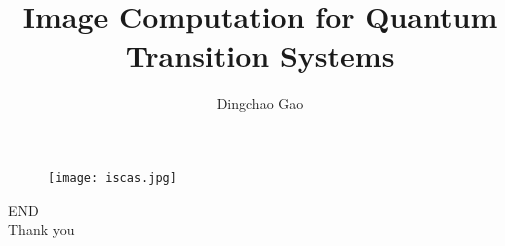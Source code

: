 \documentclass[aspectratio=1610]{beamer}
\title[TDD in quantum]{Image Computation for Quantum Transition Systems}
\author[Gcc]{Dingchao Gao}
\begin{document}
\begin{frame}[plain]
  \titlepage
  \begin{figure}
    \texttt{[image: iscas.jpg]}
  \end{figure}
\end{frame}

\begin{frame}
\centering
\Huge{END\\Thank you}
\end{frame}
\end{document}
